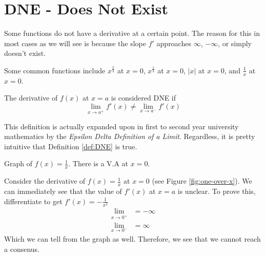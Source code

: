 \documentclass[working]{tuftebook}
\begin{document}
\chapter{DNE - Does Not Exist}
\vspace{-2em}
Some functions do not have a derivative at a certain point. The reason for this in most cases as we will see is because the slope $f'$ approaches $\infty$, $-\infty$, or simply doesn't exist.

Some common functions include $x^{ \frac{2}{3}}$ at $x=0$, $x^ \frac{1}{3}$ at $x=0$, $|x|$ at $x=0$, and $ \frac{1}{x}$ at $x=0$.

\begin{definition}[DNE]\label{def:DNE}
    The derivative of $f(x)$ at $x=a$ is considered DNE if
    \[
        \lim_{x\to a^+}f'(x)\neq \lim_{x\to a^-}f'(x)
    \]
\end{definition}

This definition is actually expanded upon in first to second year university mathematics  by the \emph{Epsilon Delta Definition of a Limit}. Regardless, it is pretty intuitive that Definition \ref{def:DNE} is true.

\begin{marginfigure}
    \centering
    \caption{Graph of $ f(x)= \frac{1}{x}$. There is a V.A at $x=0$.}
    \label{fig:one-over-x}
\end{marginfigure}

\begin{eg}
Consider the derivative of $f(x)= \frac{1}{x}$ at $x=0$ (see Figure \ref{fig:one-over-x}). We can immediately see that the value of $f'(x)$ at $x=a$ is unclear. To prove this, differentiate to get $f'(x)=- \frac{1}{x^2}$
\begin{align*}
    \lim_{x\to 0^+}&=-\infty\\ 
    \lim_{x\to 0^-}&= \infty 
\end{align*}
Which we can tell from the graph as well. Therefore, we see that we cannot reach a consenus.
\end{eg}
\end{document}
